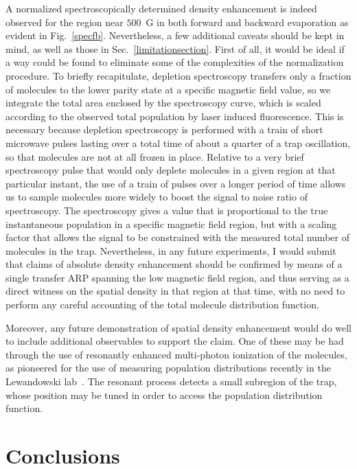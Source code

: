 A normalized spectroscopically determined density enhancement is indeed observed for the region near $500$~G in both forward and backward evaporation as evident in Fig.~\ref{specfb}.
Nevertheless, a few additional caveats should be kept in mind, as well as those in Sec.~\ref{limitationsection}.
First of all, it would be ideal if a way could be found to eliminate some of the complexities of the normalization procedure.
To briefly recapitulate, depletion spectroscopy transfers only a fraction of molecules to the lower parity state at a specific magnetic field value, so we integrate the total area enclosed by the spectroscopy curve, which is scaled according to the observed total population by laser induced fluorescence.  
This is necessary because depletion spectroscopy is performed with a train of short microwave pulses lasting over a total time of about a quarter of a trap oscillation, so that molecules are not at all frozen in place. 
Relative to a very brief spectroscopy pulse that would only deplete molecules in a given region at that particular instant, the use of a train of pulses over a longer period of time allows us to sample molecules more widely to boost the signal to noise ratio of spectroscopy. 
The spectroscopy gives a value that is proportional to the true instantaneous population in a specific magnetic field region, but with a scaling factor that allows the signal to be constrained with the measured total number of molecules in the trap.
Nevertheless, in any future experiments, I would submit that claims of absolute density enhancement should be confirmed by means of a single transfer ARP spanning the low magnetic field region, and thus serving as a direct witness on the spatial density in that region at that time, with no need to perform any careful accounting of the total molecule distribution function.

Moreover, any future demonstration of spatial density enhancement would do well to include additional observables to support the claim.
One of these may be had through the use of resonantly enhanced multi-photon ionization of the molecules, as pioneered for the use of measuring population distributions recently in the Lewandowski lab~\cite{Gray2017}.
The resonant process detects a small subregion of the trap, whose position may be tuned in order to access the population distribution function.

\section{Conclusions}

